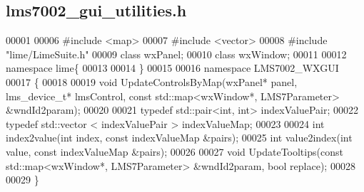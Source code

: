 \subsection{lms7002\+\_\+gui\+\_\+utilities.\+h}
\label{lms7002__gui__utilities_8h_source}

\begin{DoxyCode}
00001 
00006 \textcolor{preprocessor}{#include <map>}
00007 \textcolor{preprocessor}{#include <vector>}
00008 \textcolor{preprocessor}{#include "lime/LimeSuite.h"}
00009 \textcolor{keyword}{class }wxPanel;
00010 \textcolor{keyword}{class }wxWindow;
00011 
00012 \textcolor{keyword}{namespace }lime\{
00013 
00014 \}
00015 
00016 \textcolor{keyword}{namespace }LMS7002_WXGUI
00017 \{
00018 
00019 \textcolor{keywordtype}{void} UpdateControlsByMap(wxPanel* panel, lms_device_t* lmsControl, \textcolor{keyword}{const} std::map<wxWindow*, LMS7Parameter>
       &wndId2param);
00020 
00021 \textcolor{keyword}{typedef} std::pair<int, int> indexValuePair;
00022 \textcolor{keyword}{typedef} std::vector < indexValuePair > indexValueMap;
00023 
00024 \textcolor{keywordtype}{int} index2value(\textcolor{keywordtype}{int} index, \textcolor{keyword}{const} indexValueMap &pairs);
00025 \textcolor{keywordtype}{int} value2index(\textcolor{keywordtype}{int} value, \textcolor{keyword}{const} indexValueMap &pairs);
00026 
00027 \textcolor{keywordtype}{void} UpdateTooltips(\textcolor{keyword}{const} std::map<wxWindow*, LMS7Parameter> &wndId2param, \textcolor{keywordtype}{bool} replace);
00028 
00029 \}
\end{DoxyCode}
